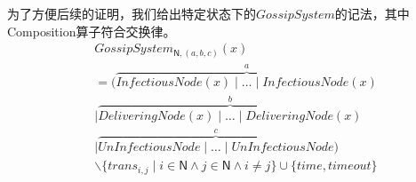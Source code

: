  \begin{definition} 为了方便后续的证明，我们给出特定状态下的$GossipSystem$的记法，其中Composition算子符合交换律。
    \begin{align*}
   &GossipSystem_{\mathsf{N},(a,b,c)}(x)\\
   &= (\stackrel{a}{\overbrace{InfectiousNode(x)\mid \dots \mid InfectiousNode(x)}}\\
   &\mid \stackrel{b}{\overbrace{DeliveringNode(x)\mid \dots\mid DeliveringNode(x)}}\\
   &\mid \stackrel{c}{\overbrace{UnInfectiousNode\mid \dots \mid UnInfectiousNode}})\\
   &\backslash \{trans_{i,j}\mid i\in \mathsf{N} \wedge j\in \mathsf{N} \wedge i\neq j\}\cup \{time, timeout\}
\end{align*}
 \end{definition} 

